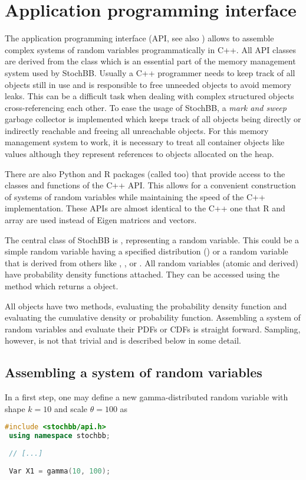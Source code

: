 \section{Application programming interface} \label{sec:api}
The application programming interface (API, see also \cite{stochbbapi}) 
allows to assemble complex systems of random variables programmatically in C++.
All API classes are derived from the  class which is an essential part of the
memory management system used by StochBB. Usually a C++ programmer needs to keep track of all
objects still in use and is responsible to free unneeded objects to avoid memory leaks. This can
be a difficult task when dealing with complex structured objects cross-referencing each other.
To ease the usage of StochBB, a \emph{mark and sweep} garbage collector is implemented which keeps track
of all objects being directly or indirectly reachable and freeing all unreachable objects. For
this memory management system to work, it is necessary to treat all container objects like values
although they represent references to objects allocated on the heap.

There are also Python and R packages (called  too) that provide access to
the classes and functions of the C++ API. This allows for a convenient construction of systems
of random variables while maintaining the speed of the C++ implementation. These APIs are 
almost identical to the C++ one that R and  array are used instead of Eigen matrices
and vectors.

The central class of StochBB is , representing a random variable. This could be a
simple random variable having a specified distribution () or a random
variable that is derived from others like , ,  or
. All random variables (atomic and derived) have probability density functions
attached. They can be accessed using the  method which returns a 
 object.

All  objects have two methods,  evaluating the probability
density function and  evaluating the cumulative density or probability
function. Assembling a system of random variables and evaluate their PDFs or CDFs is straight
forward. Sampling, however, is not that trivial and is described below in some detail.

\subsection{Assembling a system of random variables}
In a first step, one may define a new gamma-distributed random variable with shape $k=10$
and scale $\theta=100$ as
\begin{lstlisting}[language=C++]
 #include <stochbb/api.h>
 using namespace stochbb;
 
 // [...]
 
 Var X1 = gamma(10, 100);
\end{lstlisting}

